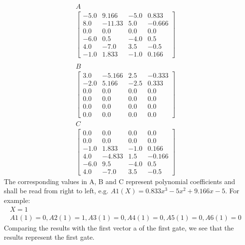 \begin{align*}
    A \\
    \begin{bmatrix}
        -5.0 & 9.166 & -5.0 & 0.833 \\
        8.0 & -11.33 & 5.0 & -0.666 \\
        0.0 & 0.0 & 0.0 & 0.0 \\
        -6.0 & 0.5 & -4.0 & 0.5 \\
        4.0 & -7.0 & 3.5 & -0.5 \\
        -1.0 & 1.833 & -1.0 & 0.166
    \end{bmatrix} \\
\end{align*}
\begin{align*}
        B \\
    \begin{bmatrix}
        3.0 & -5.166 & 2.5 & -0.333 \\
        -2.0 & 5.166 & -2.5 & 0.333 \\
        0.0 & 0.0 & 0.0 & 0.0 \\
        0.0 & 0.0 & 0.0 & 0.0 \\
        0.0 & 0.0 & 0.0 & 0.0 \\
        0.0 & 0.0 & 0.0 & 0.0
    \end{bmatrix}
\end{align*}
\begin{align*}
        C \\
    \begin{bmatrix}
        0.0 & 0.0 & 0.0 & 0.0 \\
        0.0 & 0.0 & 0.0 & 0.0 \\
        -1.0 & 1.833 & -1.0 & 0.166 \\
        4.0 & -4.833 & 1.5 & -0.166 \\
        -6.0 & 9.5 & -4.0 & 0.5 \\
        4.0 & -7.0 & 3.5 & -0.5
    \end{bmatrix}
\end{align*}
The corresponding values in A, B and C represent polynomial coefficients and shall be read from right to left, e.g. \(A1(X) = 0.833x^3 - 5x^2 + 9.166x -5\). For example:
\begin{align}
     X = 1 \\
    A1(1) = 0, A2(1) = 1, A3(1) = 0, A4(1) = 0, A5(1) = 0, A6(1) = 0
\end{align}
Comparing the results with the first vector a of the first gate, we see that the results represent the first gate.

